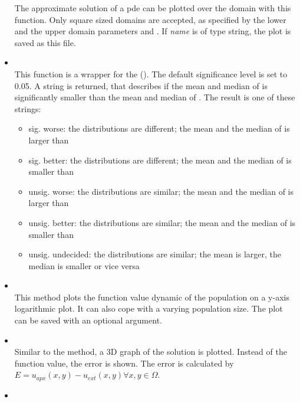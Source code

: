 \documentclass[.\jobname.tex]{subfiles}
\begin{document}
\begin{itemize}
	The approximate solution of a \gls{pde} can be plotted over the domain with this function. Only square sized domains are accepted, as specified by the lower and the upper domain parameters  and . If \textit{name} is of type string, the plot is saved as this file.
	\item 
	 \\
	This function is a wrapper for the  (\cite{scipy_scipystatswilcoxon_2020}). The default significance level is set to 0.05. A string is returned, that describes if the mean and median of  is significantly smaller than the mean and median of . The result is one of these strings: 
	\begin{itemize}
		\item sig. worse: the distributions are different; the mean and the median of  is larger than 
		\item sig. better: the distributions are different; the mean and the median of  is smaller than 
		\item unsig. worse: the distributions are similar; the mean and the median of  is larger than  
		\item unsig. better: the distributions are similar; the mean and the median of  is smaller than 
		\item unsig. undecided: the distributions are similar; the mean is larger, the median is smaller or vice versa
	\end{itemize} 
	\item {} \\
	This method plots the function value dynamic of the population on a y-axis logarithmic plot. It can also cope with a varying population size. The plot can be saved with an optional argument. 
	\item {} \\
	Similar to the 	 method, a 3D graph of the solution is plotted. Instead of the function value, the error is shown. The error is calculated by $E  = u_{apx}(x,y) - u_{ext}(x,y) \forall x,y \in \Omega$. 
	\item {} \\

\end{itemize}
\end{document}
